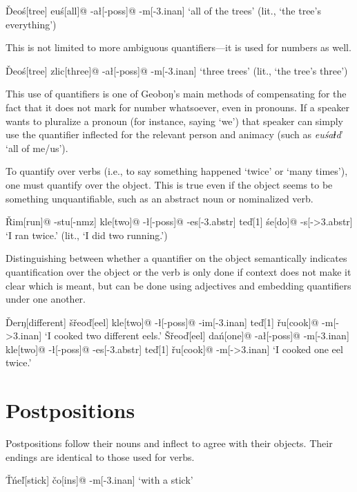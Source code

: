 \documentclass[a4paper,11pt,oneside,openany]{memoir}
\newcommand{\vd}{ď}
\newcommand{\vc}{č}
\newcommand{\vs}{š}
\newcommand{\vr}{ř}
\newcommand{\vl}{ľ}
\newcommand{\vT}{Ť}
\newcommand{\vD}{Ď}
\newcommand{\vS}{Š}
\newcommand{\vR}{Ř}
\newcommand{\dbl}{ⱡ}
\newcommand{\engma}{ŋ}
\begin{document}
\ex
\begingl
\vD eo\'s[tree]
eu\'s[all]@
-a\l[-{\sc poss}]@
-m[-{\sc 3.inan}]
\glft `all of the trees' (lit., `the tree's everything')
\endgl
\xe

This is not limited to more ambiguous quantifiers---it is used for numbers as well.

\ex
\begingl
\vD eo\'s[tree]
zlic[three]@
-a\l[-{\sc poss}]@
-m[-{\sc 3.inan}]
\glft `three trees' (lit., `the tree's three')
\endgl
\xe

This use of quantifiers is one of Geobo{\engma}'s main methods of compensating for the fact that it does not mark for number whatsoever, even in pronouns. If a speaker wants to pluralize a pronoun (for instance, saying `we') that speaker can simply use the quantifier inflected for the relevant person and animacy (such as \textit{eu\'sa\dbl\vd} `all of me/us').

To quantify over verbs (i.e., to say something happened `twice' or `many times'), one must quantify over the object. This is true even if the object seems to be something unquantifiable, such as an abstract noun or nominalized verb.

\ex
\begingl
\vR im[run]@
-stu[-{\sc nmz}]
kle[two]@
-\l[-{\sc poss}]@
-es[-{\sc 3.abstr}]
te{\vd}[1]
\'se[do]@
-s[-{\sc >3.abstr}]
\glft `I ran twice.' (lit., `I did two running.')
\endgl
\xe

Distinguishing between whether a quantifier on the object semantically indicates quantification over the object or the verb is only done if context does not make it clear which is meant, but can be done using adjectives and embedding quantifiers under one another.

\pex
\a
\begingl
\vD er\engma[different]
\vs\vr eo\vd[eel]
kle[two]@
-\l[-{\sc poss}]@
-im[-{\sc 3.inan}]
te\vd[1]
\vr u[cook]@
-m[-{\sc >3.inan}]
\glft `I cooked two different eels.'
\endgl
\a
\begingl
\vS\vr eo\vd[eel]
da\'n[one]@
-a\l[-{\sc poss}]@
-m[-{\sc 3.inan}]
kle[two]@
-\l[-{\sc poss}]@
-es[-{\sc 3.abstr}]
te\vd[1]
\vr u[cook]@
-m[{\sc ->3.inan}]
\glft `I cooked one eel twice.'
\endgl
\xe

\section{Postpositions}

Postpositions follow their nouns and inflect to agree with their objects. Their endings are identical to those used for verbs.

\ex
\begingl
\vT\'ne{\vl}[stick]
\vc o[{\sc ins}]@
-m[-{\sc 3.inan}]
\glft `with a stick'
\endgl
\xe
\end{document}
